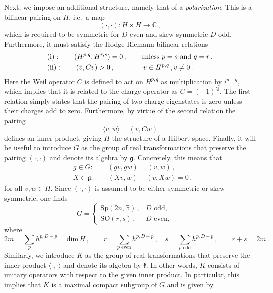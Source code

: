 \documentclass[11pt,a4paper]{article}
\numberwithin{equation}{section}
\numberwithin{table}{section}\setlength{\multlinegap}{25pt}
\begin{document}
Next, we impose an additional structure, namely that of a \textit{polarization}. This is a bilinear pairing on $H$, i.e.~a map
\begin{equation}
	(\cdot, \cdot): H\times H\rightarrow\mathbb{C}\,,
\end{equation}
which is required to be symmetric for $D$ even and skew-symmetric $D$ odd. Furthermore, it must satisfy the Hodge-Riemann bilinear relations 
\begin{align}
	&\text{(i)}:\qquad (H^{p,q}, H^{r,s}) = 0\,,\qquad \text{unless $p=s$ and $q=r$}\,,\\
	\label{eq:positivity}&\text{(ii)}:\qquad (\bar{v},Cv) > 0\,,\hspace{1.45cm} v\in H^{p,q}\,,v\neq 0\,.
\end{align}
Here the Weil operator $C$ is defined to act on $H^{p,q}$ as multiplication by $i^{p-q}$, which implies that it is related to the charge operator as $C=(-1)^{Q}$. The first relation simply states that the pairing of two charge eigenstates is zero unless their charges add to zero. Furthermore, by virtue of the second relation the pairing
\begin{equation}
	\langle v , w \rangle = (\bar{v}, Cw)
\end{equation}
defines an inner product, giving $H$ the structure of a Hilbert space. Finally, it will be useful to introduce $G$ as the group of real transformations that preserve the pairing $(\cdot,\cdot)$ and denote its algebra by $\mathfrak{g}$. Concretely, this means that
\begin{align}
\label{eq:def_G}	&g\in G:\qquad (gv, gw) = (v,w)\,,\\
\label{eq:def_g}	&X\in \mathfrak{g}:\qquad (Xv, w)+(v, Xw) = 0\,,
\end{align}
for all $v,w\in H$. Since $(\cdot,\cdot)$ is assumed to be either symmetric or skew-symmetric, one finds
\begin{equation}
	G = \begin{cases}
		\mathrm{Sp}(2n,\mathbb{R})\,, & \text{$D$ odd,}\qquad \\
		\mathrm{SO}(r,s)\,, & \text{$D$ even,}
	\end{cases}
\end{equation} 
where
\begin{equation}
	2m = \sum_{p} h^{p,D-p} = \mathrm{dim}\,H\,,\qquad r = \sum_{\text{$p$ even}} h^{p,D-p}\,,\quad s= \sum_{\text{$p$ odd}} h^{p,D-p}\,,\qquad r+s=2m\,.
\end{equation}
Similarly, we introduce $K$ as the group of real transformations that preserve the inner product $\langle\cdot,\cdot\rangle$ and denote its algebra by $\mathfrak{k}$. In other words, $K$ consists of unitary operators with respect to the given inner product. In particular, this implies that $K$ is a maximal compact subgroup of $G$ and is given by
\end{document}
